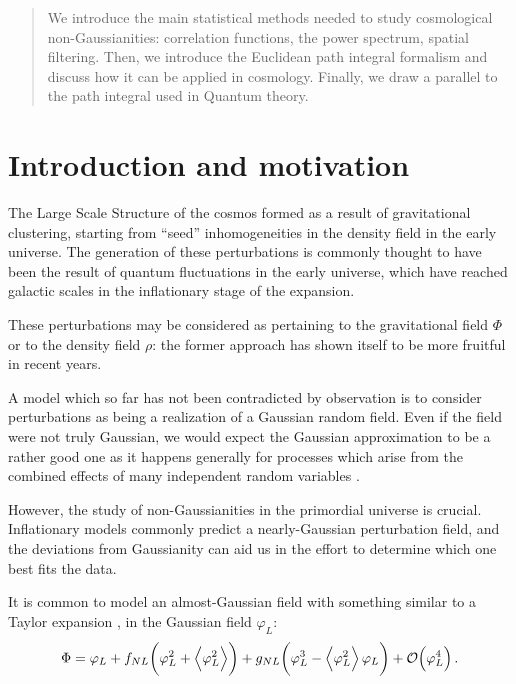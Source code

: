 \documentclass[main.tex]{subfiles}
\begin{document}
\begin{abstract}
    We introduce the main statistical methods needed to study cosmological non-Gaussianities: correlation functions, the power spectrum, spatial filtering.
    Then, we introduce the Euclidean path integral formalism and discuss how it can be applied in cosmology. 
    Finally, we draw a parallel to the path integral used in Quantum theory.
\end{abstract}

\section{Introduction and motivation}

The Large Scale Structure of the cosmos formed as a result of gravitational clustering, starting from ``seed'' inhomogeneities in the density field in the early universe. 
The generation of these perturbations is commonly thought to have been the result of quantum fluctuations in the early universe, which have reached galactic scales in the inflationary stage of the expansion. 

These perturbations may be considered as pertaining to the gravitational field \(\Phi \) or to the density field \(\rho \): the former approach has shown itself to be more fruitful in recent years.

A model which so far has not been contradicted by observation is to consider perturbations as being a realization of a Gaussian random field. 
Even if the field were not truly Gaussian, we would expect the Gaussian approximation to be a rather good one as it happens generally for processes which arise from the combined effects of many independent random variables \cite[pag.\ 2]{celoriaPrimordialNonGaussianity2018}. 

However, the study of non-Gaussianities in the primordial universe is crucial. Inflationary models commonly predict a nearly-Gaussian perturbation field, and the deviations from Gaussianity can aid us in the effort to determine which one best fits the data. 

It is common to model an almost-Gaussian field with something similar to a Taylor expansion \cite[eq.\ 1]{matarreseAbundanceHighRedshift2000}, \cite[eq.\ 1]{celoriaPrimordialNonGaussianity2018} in the Gaussian field \(\varphi _L\): 
%
\begin{align} \label{eq:perturbed-gaussian-field}
\Phi = \varphi _L + f_{NL} \qty(\varphi _L^2 + \expval{\varphi _L^2}) + g_{NL} \qty(\varphi _L^3 - \expval{\varphi _L^2} \varphi _L) + \order{\varphi _L^{4}} 
\,.
\end{align}
\end{document}
